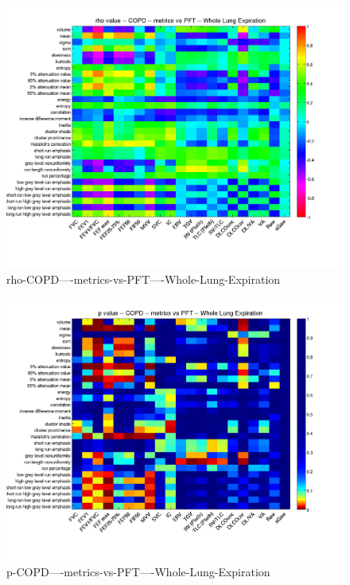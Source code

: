 \documentclass[12pt]{article}
\begin{document}
\begin{figure}
    \includegraphics[width=0.84\linewidth,viewport=100 60 620 550]{corr/rho-COPD----metrics-vs-PFT----Whole-Lung-Expiration.png}
    \caption{rho-COPD----metrics-vs-PFT----Whole-Lung-Expiration}
    \label{fig:rho-COPD----metrics-vs-PFT----Whole-Lung-Expiration}
\end{figure}
\begin{figure}
    \includegraphics[width=0.84\linewidth,viewport=100 60 620 550]{corr/p-COPD----metrics-vs-PFT----Whole-Lung-Expiration.png}
    \caption{p-COPD----metrics-vs-PFT----Whole-Lung-Expiration}
    \label{fig:p-COPD----metrics-vs-PFT----Whole-Lung-Expiration}
\end{figure}
\end{document}
